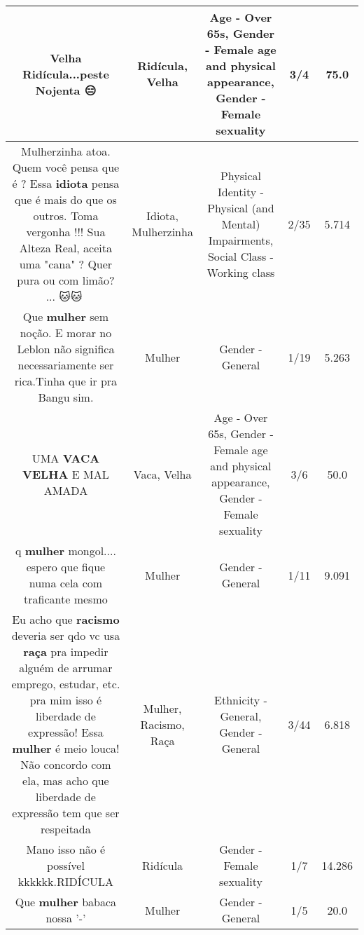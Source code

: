\documentclass[11pt]{article}
\newlength\mylength
\begin{document}
\begin{center}
\begin{longtable}{|C{.65\mylength}|C{.30\mylength}|C{.12\mylength}|C{.12\mylength}|C{.12\mylength}|}
  \small Velha \textbf{Ridícula}...peste Nojenta 😑\normalsize   & Ridícula, Velha & Age - Over 65s, Gender - Female age and physical appearance, Gender - Female sexuality & 3/4 & 75.0 \\  \hline
  \small Mulherzinha atoa. Quem você  pensa que é ? Essa \textbf{idiota} pensa  que é  mais do que os outros. Toma vergonha !!! Sua Alteza Real, aceita uma "cana" ? Quer pura ou com limão? ... 🐱🐱🐶\normalsize   & Idiota, Mulherzinha & Physical Identity - Physical (and Mental) Impairments, Social Class - Working class & 2/35 & 5.714 \\  \hline
  \small Que \textbf{mulher} sem noção. E morar no Leblon não significa necessariamente ser rica.Tinha que ir pra Bangu sim.\normalsize   & Mulher & Gender - General & 1/19 & 5.263 \\  \hline
  \small UMA \textbf{VACA} \textbf{V\textbf{ELHA}} E MAL AMADA\normalsize   & Vaca, Velha & Age - Over 65s, Gender - Female age and physical appearance, Gender - Female sexuality & 3/6 & 50.0 \\  \hline
  \small q \textbf{mulher} mongol.... espero que fique numa cela com traficante mesmo\normalsize   & Mulher & Gender - General & 1/11 & 9.091 \\  \hline
  \small Eu acho que \textbf{racismo} deveria ser qdo vc usa \textbf{raça} pra impedir alguém de arrumar emprego, estudar, etc. pra mim isso é liberdade de expressão! Essa \textbf{mulher} é meio louca! Não concordo com ela, mas acho que liberdade de expressão tem que ser respeitada\normalsize   & Mulher, Racismo, Raça & Ethnicity - General, Gender - General & 3/44 & 6.818 \\  \hline
  \small Mano isso não é possível kkkkkk.RIDÍCULA\normalsize   & Ridícula & Gender - Female sexuality & 1/7 & 14.286 \\  \hline
  \small Que \textbf{mulher} babaca nossa '-'\normalsize   & Mulher & Gender - General & 1/5 & 20.0 \\  \hline

\end{longtable}
\end{center}
\end{document}
